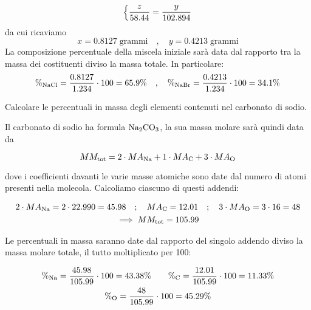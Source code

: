 \begin{soluzione}
\begin{equation*}
\begin{dcases}
            \frac{z}{58.44}=\frac{y}{102.894}
        \end{dcases}
    \end{equation*}
    da cui ricaviamo
    \begin{equation*}
        x=0.8127 \; \text{grammi}
        \quad,\quad
        y=0.4213 \; \text{grammi}
    \end{equation*}
    La composizione percentuale della miscela iniziale sarà data dal rapporto tra la massa dei costituenti diviso la massa totale. In particolare:
    \begin{equation*}
        \%_{\rm NaCl}=\frac{0.8127}{1.234} \cdot 100=65.9\%
        \quad,\quad
        \%_{\rm NaBr}=\frac{0.4213}{1.234} \cdot 100=34.1\%
    \end{equation*}
\end{soluzione}

\newpage

\begin{esercizio}
    Calcolare le percentuali in massa degli elementi contenuti nel carbonato di sodio.
\end{esercizio}
\begin{soluzione}
    Il carbonato di sodio ha formula $\rm Na_2CO_3$, la sua massa molare sarà quindi data da

\begin{equation*}
    MM_{\rm tot}=2 \cdot MA_{\rm Na} + 1 \cdot MA_{\rm C} + 3 \cdot MA_{\rm O}
\end{equation*}

dove i coefficienti davanti le varie masse atomiche sono date dal numero di atomi presenti nella molecola. Calcoliamo ciascuno di questi addendi:

\begin{gather*}
    2 \cdot MA_{\rm Na}
    =2 \cdot 22.990
    =45.98
    \quad;\quad
    MA_{\rm C}
    =12.01
    \quad;\quad
    3 \cdot MA_{\rm O}
    =3 \cdot 16
    =48
    \\
    \implies
    MM_{\rm tot}=105.99
\end{gather*}

Le percentuali in massa saranno date dal rapporto del singolo addendo diviso la massa molare totale, il tutto moltiplicato per 100:

\begin{gather*}
    \%_{\rm Na}
    =\frac{45.98}{105.99} \cdot 100
    =43.38 \%
    \qquad
    \%_{\rm C}
    =\frac{12.01}{105.99} \cdot 100
    =11.33 \%
    \\
    \%_{\rm O}
    =\frac{48}{105.99} \cdot 100
    =45.29\%
\end{gather*}

\end{soluzione}